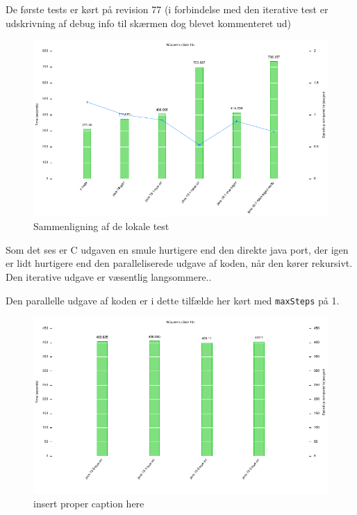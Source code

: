 De første tests er kørt på revision 77 (i forbindelse med den iterative test er
udskrivning af debug info til skærmen dog blevet kommenteret ud)

\begin{figure}[h]
\begin{center}
\includegraphics{../benchmarks/lokal.pdf}
\caption{Sammenligning af de lokale test} 
\label{figur:lokal}
\end{center}
\end{figure}

Som det ses er C udgaven en smule hurtigere end den direkte java port, der igen
er lidt hurtigere end den paralleliserede udgave af koden, når den kører
rekursivt. Den iterative udgave er væsentlig langsommere..

Den parallelle udgave af koden er i dette tilfælde her kørt med
\texttt{maxSteps} på 1. 
\begin{figure}[h]
\begin{center}
\includegraphics{../benchmarks/maxsteps.pdf}
\caption{insert proper caption here } 
\label{figur:maxsteps}
\end{center}
\end{figure}

